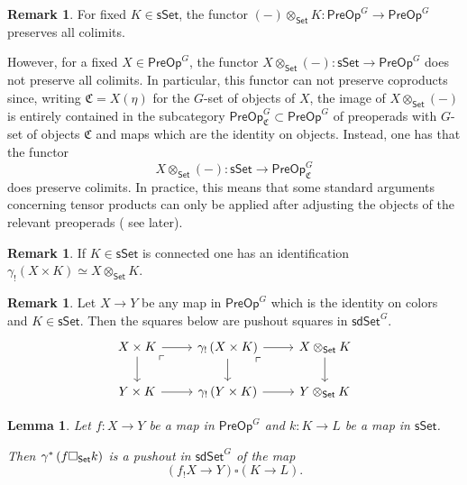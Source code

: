 \documentclass[a4paper,10pt
,draft
]{article}%
\numberwithin{equation}{section}
\numberwithin{figure}{section}
\newtheorem{lemma}[equation]{Lemma}%
\theoremstyle{definition} %
\newtheorem{remark}[equation]{Remark}%
\newcommand{\1}{\ensuremath{\mathbbm 1}}%
\begin{document}
\begin{remark}
	For fixed $K \in \mathsf{sSet}$, the functor
	$(-) \otimes_{\mathsf{Set}} K
	\colon \mathsf{PreOp}^G \to \mathsf{PreOp}^G$
	preserves all colimits. 
	
	However, for a fixed $X \in \mathsf{PreOp}^G$,
	the functor 
	$X \otimes_{\mathsf{Set}} (-)
	\colon \mathsf{sSet} \to \mathsf{PreOp}^G$
	does not preserve all colimits.
	In particular, this functor can not preserve coproducts since, writing 
	$\mathfrak{C} = X(\eta)$ for the $G$-set of objects of $X$,
	the image of $X \otimes_{\mathsf{Set}} (-)$ is entirely contained in the subcategory
	$\mathsf{PreOp}^{G}_{\mathfrak{C}} \subset
	\mathsf{PreOp}^G$
	of preoperads with $G$-set of objects $\mathfrak{C}$ and maps which are the identity on objects. 
	Instead, one has that the functor 
\[
	X \otimes_{\mathsf{Set}} (-) \colon
	\mathsf{sSet} \to \mathsf{PreOp}^{G}_{\mathfrak{C}}
\]
	does preserve colimits. 
	In practice, this means that some standard arguments concerning tensor products can only be applied after adjusting the objects of the relevant preoperads
	({\color{red} see later}).
\end{remark}


\begin{remark}\label{OTIMCON REM}
	If $K \in \mathsf{sSet}$ is connected one has an identification
	$\gamma_! \left(X \times K\right) \simeq 
	X \otimes_{\mathsf{Set}} K$.
\end{remark}



\begin{remark}\label{COLORTENSGAM REM}
	Let $X \to Y$ be any map in $\mathsf{PreOp}^G$
	which is the identity on colors and 
	$K \in \mathsf{sSet}$. Then the squares below are pushout squares in $\mathsf{sdSet}^G$.
	\[
	\begin{tikzcd}
	X \times K \ar{r} \ar{d} 
	\arrow[dr, phantom, "\ulcorner", very near start] &
	\gamma_! \left( X \times K \right) \ar{r} \ar{d} 
	\arrow[dr, phantom, "\ulcorner", very near start] &
	X \otimes_{\mathsf{Set}} K \ar{d}
	\\
	Y \times K \ar{r} &
	\gamma_! \left( Y \times K \right) \ar{r} &
	Y \otimes_{\mathsf{Set}} K
	\end{tikzcd}
	\]
\end{remark}


\begin{lemma}\label{OTIMSETPUSH LEM}
	Let $f\colon X \to Y$ be a map in $\mathsf{PreOp}^G$
	and $k \colon K \to L$ be a map in $\mathsf{sSet}$.

	Then $\gamma^{\**}\left(f \square_{\mathsf{Set}} k\right)$
	is a pushout in $\mathsf{sdSet}^G$
	of the map
\[
	\left(f_! X \to Y\right)
	\square
	\left( K \to L \right).
\]
\end{lemma}
\end{document}
